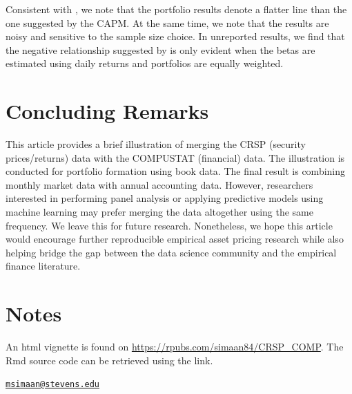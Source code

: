 Consistent with \cite{fama2004capital}, we note that the portfolio results denote a flatter line than the one suggested by the CAPM. At the same time, we note that the results are noisy and sensitive to the sample size choice. In unreported results, we find that the negative relationship suggested by \cite{frazzini2014betting}  is only evident when the betas are estimated using daily returns and portfolios are equally weighted. 



\hypertarget{concluding-remarks}{%
\section{Concluding Remarks}\label{concluding-remarks}}

This article provides a brief illustration of merging the CRSP
(security prices/returns) data with the COMPUSTAT (financial) data. The
illustration is conducted for portfolio formation using
book data. The final result is combining monthly market data with annual
accounting data. However, researchers interested in performing
panel analysis or applying predictive models using machine learning may
prefer merging the data altogether using the same frequency. We leave
this for future research. Nonetheless, we hope this article would
encourage further reproducible empirical asset pricing research while
also helping bridge the gap between the data science
community and the empirical finance literature.


\hypertarget{notes}{%
\section{Notes}\label{notes}}

An html vignette is found on \url{https://rpubs.com/simaan84/CRSP_COMP}.
The Rmd source code can be retrieved using the link.




\address{%
Majeed Simaan \\
School of Business, Stevens Institute of Technology \\ 
1 Castle Point Terrace, Babbio Center, Hoboken, NJ 07030, USA.\\
}
\href{mailto:msimaan@stevens.edu}{\nolinkurl{msimaan@stevens.edu}}


